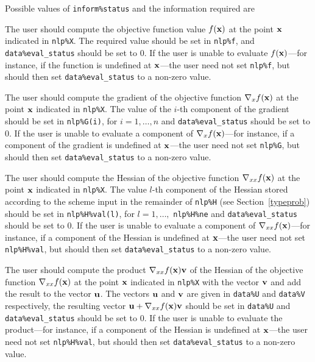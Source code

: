 \documentclass{galahad}
\begin{document}
Possible values of {\tt inform\%status} and the information required are
\begin{description}
 The user should compute the objective function
     value $f({\mathbf{x}})$ at the point ${\mathbf{x}}$ indicated in {\tt nlp\%X}.
     The required value should be set in {\tt nlp\%f}, and
     {\tt data\%eval\_status} should be set to 0. If the user is
     unable to evaluate $f({\mathbf{x}})$---for instance, if the function is
     undefined at ${\mathbf{x}}$---the user need not set {\tt nlp\%f}, but
     should then set {\tt data\%eval\_status} to a non-zero value.

 The user should compute the gradient
     of the objective function $\nabla_x f({\mathbf{x}})$ at the point ${\mathbf{x}}$
     indicated in {\tt nlp\%X}.
     The value of the $i$-th component of the gradient should be set
     in {\tt nlp\%G(i)},      for $i = 1, \ldots, n$ and
     {\tt data\%eval\_status} should be set to 0. If the user is
     unable to evaluate a component of $\nabla_x f({\mathbf{x}})$---for instance,
     if a component of the gradient is
     undefined at ${\mathbf{x}}$---the user need not set {\tt nlp\%G}, but
     should then set {\tt data\%eval\_status} to a non-zero value.

 The user should compute the Hessian
     of the objective function $\nabla_{xx} f({\mathbf{x}})$ at the point ${\mathbf{x}}$
     indicated in {\tt nlp\%X}.
     The value $l$-th component of the Hessian stored according to the
     scheme input in the remainder of {\tt nlp\%H} (see Section~\ref{typeprob})
     should be set in {\tt nlp\%H\%val(l)},
     for $l = 1, \ldots,$ {\tt  nlp\%H\%ne} and
     {\tt data\%eval\_status} should be set to 0. If the user is
     unable to evaluate a component of $\nabla_{xx} f({\mathbf{x}})$---for instance,
     if a component of the Hessian is
     undefined at ${\mathbf{x}}$---the user need not set {\tt nlp\%H\%val}, but
     should then set {\tt data\%eval\_status} to a non-zero value.

 The user should compute the product
     $\nabla_{xx} f({\mathbf{x}}){\mathbf{v}}$ of the Hessian
     of the objective function $\nabla_{xx} f({\mathbf{x}})$ at the point ${\mathbf{x}}$
     indicated in {\tt nlp\%X} with the vector ${\mathbf{v}}$ and add the result to
     the vector ${\mathbf{u}}$. The vectors ${\mathbf{u}}$ and ${\mathbf{v}}$ are given in
     {\tt data\%U} and {\tt data\%V} respectively, the resulting
     vector ${\mathbf{u}} + \nabla_{xx} f({\mathbf{x}}){\mathbf{v}}$ should be set in {\tt data\%U}
     and  {\tt data\%eval\_status} should be set to 0. If the user is
     unable to evaluate the product---for instance,
     if a component of the Hessian is
     undefined at ${\mathbf{x}}$---the user need not set {\tt nlp\%H\%val}, but
     should then set {\tt data\%eval\_status} to a non-zero value.


\end{description}
\end{document}
